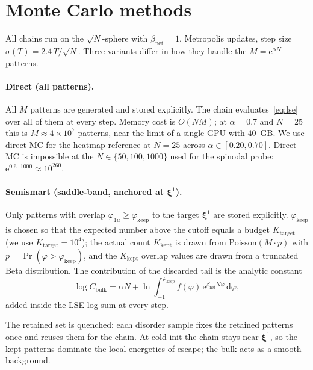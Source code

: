 \documentclass[11pt]{article}
\newcommand{\bxi}{\boldsymbol{\xi}}
\newcommand{\e}{{\mathrm{e}}}
\newcommand{\dd}{{\mathrm{d}}}
\newcommand{\Bnet}{\beta_{\mathrm{net}}}
\begin{document}
\section{Monte Carlo methods}
\label{sec:mc}

All chains run on the $\sqrt{N}$-sphere with $\Bnet = 1$, Metropolis
updates, step size $\sigma(T) = 2.4\,T / \sqrt{N}$.  Three variants
differ in how they handle the $M = \e^{\alpha N}$ patterns.

\paragraph{Direct (all patterns).}
All $M$ patterns are generated and stored explicitly.  The chain
evaluates~\eqref{eq:lse} over all of them at every step.  Memory cost
is $O(N M)$; at $\alpha = 0.7$ and $N = 25$ this is
$M \approx 4 \times 10^7$ patterns, near the limit of a single GPU
with $40$~GB.  We use direct MC for the heatmap reference at $N = 25$
across $\alpha \in [0.20, 0.70]$.  Direct MC is impossible at the $N
\in \{50, 100, 1000\}$ used for the spinodal probe: $\e^{0.6 \cdot
1000} \approx 10^{260}$.

\paragraph{Semismart (saddle-band, anchored at $\bxi^1$).}
Only patterns with overlap $\varphi_{1\mu} \geq \varphi_{\mathrm{keep}}$
to the target $\bxi^1$ are stored explicitly.  $\varphi_{\mathrm{keep}}$
is chosen so that the expected number above the cutoff equals a budget
$K_{\mathrm{target}}$ (we use $K_{\mathrm{target}} = 10^4$); the actual
count $K_{\mathrm{kept}}$ is drawn from $\mathrm{Poisson}(M \cdot p)$
with $p = \Pr(\varphi > \varphi_{\mathrm{keep}})$, and the
$K_{\mathrm{kept}}$ overlap values are drawn from a truncated Beta
distribution.  The contribution of the discarded tail is the analytic
constant
\begin{equation}
\log C_{\mathrm{bulk}}
   = \alpha N + \ln\!\int_{-1}^{\varphi_{\mathrm{keep}}}
        f(\varphi)\,\e^{\Bnet N \varphi}\,\dd\varphi,
\label{eq:Cbulk}
\end{equation}
added inside the LSE log-sum at every step.

The retained set is quenched: each disorder sample fixes the retained
patterns once and reuses them for the chain.  At cold init the chain
stays near $\bxi^1$, so the kept patterns dominate the local energetics
of escape; the bulk acts as a smooth background.
\end{document}
